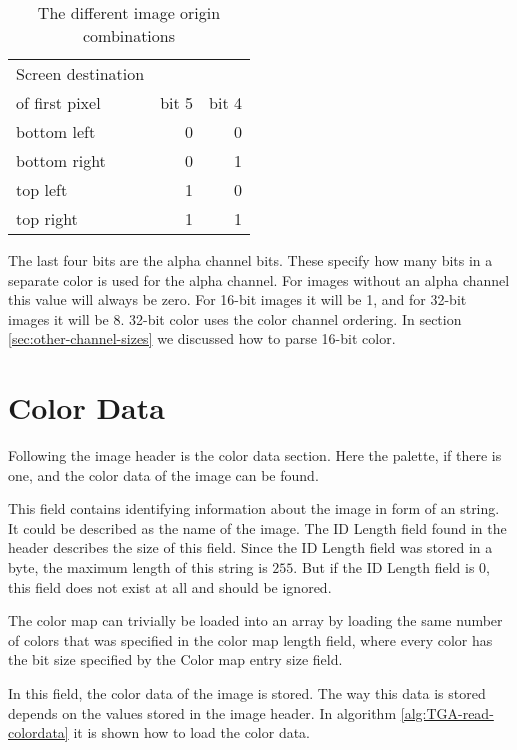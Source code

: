 \begin{table}
  \centering
  \begin{tabular}{lrr}
    \toprule
    Screen destination \\ of first pixel & bit 5 & bit 4 \\
    \midrule
    bottom left & 0 & 0 \\
    bottom right & 0 & 1 \\
    top left & 1 & 0 \\
    top right & 1 & 1 \\
    \bottomrule
  \end{tabular}
  \caption{The different image origin combinations}
  \label{tab:image-origin}
\end{table}

The last four bits are the alpha channel bits. These specify how many
bits in a separate color is used for the alpha channel. For images
without an alpha channel this value will always be zero. For 16-bit
images it will be 1, and for 32-bit images it will be 8. 32-bit color
uses the \argb color channel ordering. In section
\ref{sec:other-channel-sizes} we discussed how to parse 16-bit color.

\section{Color Data}
\label{sec:color-data}

Following the image header is the color data section. Here the
palette, if there is one, and the color data of the image can be
found.


This field contains identifying information about the image in form of
an \ascii string. It could be described as the name of the image. The
ID Length field found in the header describes the size of this
field. Since the ID Length field was stored in a byte, the maximum
length of this string is $255$. But if the ID Length field is 0, this
field does not exist at all and should be ignored.


The color map can trivially be loaded into an array by loading the
same number of colors that was specified in the color map length
field, where every color has the bit size specified by the Color map
entry size field.


In this field, the color data of the image is stored. The way this
data is stored depends on the values stored in the image header. In
algorithm \ref{alg:TGA-read-colordata} it is shown how to load the
color data.

